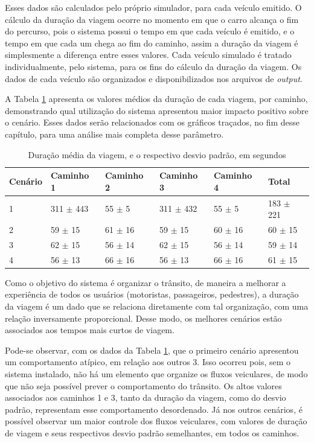 Esses dados são calculados pelo próprio simulador, para cada veículo emitido. O cálculo da duração da viagem ocorre no momento em que o carro alcança o fim do percurso, pois o sistema possui o tempo em que cada veículo é emitido, e o tempo em que cada um chega ao fim do caminho, assim a duração da viagem é simplesmente a diferença entre esses valores. Cada veículo simulado é tratado individualmente, pelo sistema, para os fins do cálculo da duração da viagem. Os dados de cada veículo são organizados e disponibilizados nos arquivos de \textit{output}.

A Tabela \ref{tab: duration} apresenta os valores médios da duração de cada viagem, por caminho, demonstrando qual utilização do sistema apresentou maior impacto positivo sobre o cenário. Esses dados serão relacionados com os gráficos traçados, no fim desse capítulo, para uma análise mais completa desse parâmetro.

\begin{table}[H]
\centering
\caption{Duração média da viagem, e o respectivo desvio padrão, em segundos}
\label{tab: duration}
\begin{tabular}{@{}llllll@{}}
\toprule
Cenário & Caminho 1 & Caminho 2 & Caminho 3 & Caminho 4 & Total \\ \midrule
1 & 311 $\pm$ 443 & 55 $\pm$ 5 & 311 $\pm$ 432 & 55 $\pm$ 5 & 183 $\pm$ 221 \\
2 & 59 $\pm$ 15 & 61 $\pm$ 16 & 59 $\pm$ 15 & 60 $\pm$ 16 & 60 $\pm$ 15 \\
3 &	62 $\pm$ 15 & 56 $\pm$ 14 & 62 $\pm$ 15 & 56 $\pm$ 14 & 59 $\pm$ 14 \\
4 & 56 $\pm$ 13 & 66 $\pm$ 16 & 56 $\pm$ 13 & 66 $\pm$ 16 & 61 $\pm$ 15 \\
\bottomrule
\end{tabular}
\end{table}

Como o objetivo do sistema é organizar o trânsito, de maneira a melhorar a experiência de todos os usuários (motoristas, passageiros, pedestres), a duração da viagem é um dado que se relaciona diretamente com tal organização, com uma relação inversamente proporcional. Desse modo, os melhores cenários estão associados aos tempos mais curtos de viagem.

Pode-se observar, com os dados da Tabela \ref{tab: duration}, que o primeiro cenário apresentou um comportamento atípico, em relação aos outros 3. Isso ocorreu pois, sem o sistema instalado, não há um elemento que organize os fluxos veiculares, de modo que não seja possível prever o comportamento do trânsito. Os altos valores associados aos caminhos 1 e 3, tanto da duração da viagem, como do desvio padrão, representam esse comportamento desordenado. Já nos outros cenários, é possível observar um maior controle dos fluxos veiculares, com valores de duração de viagem e seus respectivos desvio padrão semelhantes, em todos os caminhos.

